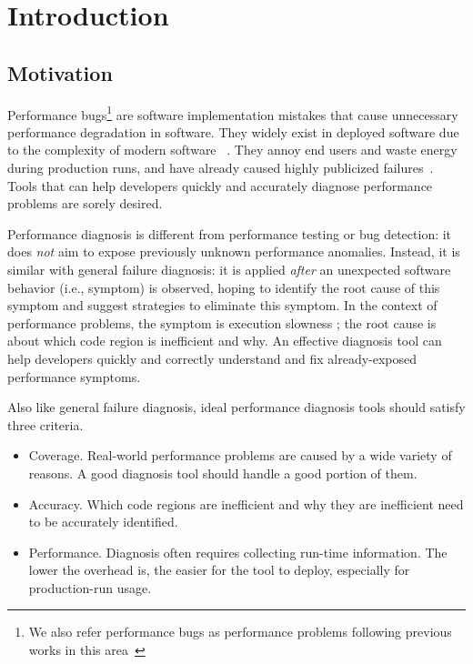 \section{Introduction}
\label{sec:intro}
\subsection{Motivation}

Performance bugs\footnote{We also refer performance bugs as performance problems
following previous works in this area~\cite{PerfBug,Alabama,SongOOPSLA2014}} 
are software implementation mistakes that cause unnecessary performance
degradation in software. They widely exist in deployed software due to the 
complexity of modern software
~\cite{PerfBug,perf.fse10,rily.perftest,perfantipattern,xiao13:context}. 
They annoy end users and waste energy during production runs, and 
have already caused highly publicized failures~\cite{ACA-health,colorado}.
Tools that can help
developers quickly and accurately diagnose performance problems
are sorely desired.

Performance diagnosis is different from performance testing or
bug detection: it does \textit{not} aim to expose previously unknown performance
anomalies. 
Instead, it is similar with general failure diagnosis: 
it is applied \textit{after} an unexpected software behavior (i.e., symptom)
is observed, hoping to identify the root cause of this symptom and suggest
strategies to eliminate this symptom.
In the context of performance problems, the symptom is execution 
slowness \cite{SongOOPSLA2014}; the root cause is about
which code region is inefficient and why.
An effective diagnosis tool can help developers quickly and correctly understand 
and fix already-exposed performance symptoms.

Also like general failure diagnosis, ideal performance diagnosis tools should
satisfy three criteria.
\begin{itemize}
\item Coverage. 
Real-world performance problems are caused by a wide variety of reasons.
A good diagnosis tool should handle a good portion of them.

\item Accuracy. 
Which code regions are inefficient and why they are inefficient
need to be accurately identified.

\item Performance. 
Diagnosis often requires collecting run-time information. The lower the overhead
is, the easier for the tool to deploy, especially for 
production-run usage. 
\end{itemize}

